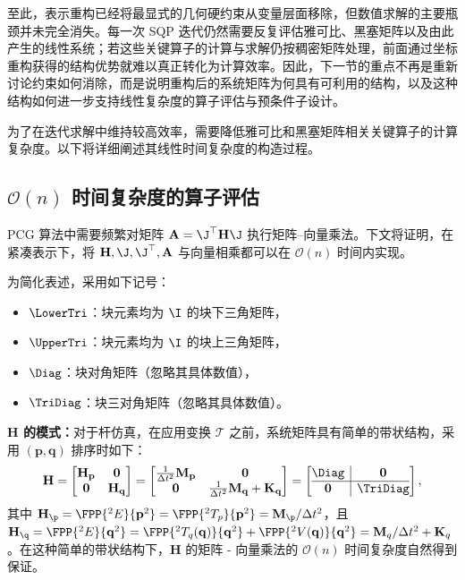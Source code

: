 
至此，表示重构已经将最显式的几何硬约束从变量层面移除，但数值求解的主要瓶颈并未完全消失。每一次 SQP 迭代仍然需要反复评估雅可比、黑塞矩阵以及由此产生的线性系统；若这些关键算子的计算与求解仍按稠密矩阵处理，前面通过坐标重构获得的结构优势就难以真正转化为计算效率。因此，下一节的重点不再是重新讨论约束如何消除，而是说明重构后的系统矩阵为何具有可利用的结构，以及这种结构如何进一步支持线性复杂度的算子评估与预条件子设计。

为了在迭代求解中维持较高效率，需要降低雅可比和黑塞矩阵相关关键算子的计算复杂度。以下将详细阐述其线性时间复杂度的构造过程。
\subsection{\texorpdfstring{$\mathcal{O}(n)$}{O(n)} 时间复杂度的算子评估}
\label{ssec:jacobian-patt}

PCG 算法中需要频繁对矩阵 $\mathbf{A} = \J^\top\mathbf{H}\J$ 执行矩阵--向量乘法。下文将证明，在紧凑表示下，将 $\mathbf{H}, \J, \J^\top, \mathbf{A}$ 与向量相乘都可以在 $\mathcal{O}(n)$ 时间内实现。

为简化表述，采用如下记号：
\begin{itemize}
  \item $\LowerTri$：块元素均为 $\I$ 的块下三角矩阵，
  \item $\UpperTri$：块元素均为 $\I$ 的块上三角矩阵，
  \item $\Diag$：块对角矩阵（忽略其具体数值），
  \item $\TriDiag$：块三对角矩阵（忽略其具体数值）。
\end{itemize}

\textbf{$\mathbf H$ 的模式：}对于杆仿真，在应用变换 $\mathcal T$ 之前，系统矩阵具有简单的带状结构，采用 $(\mathbf{p}, \mathbf{q})$ 排序时如下：
\begin{equation}
  \label{eq:H-patt}
  \mathbf{H} =
  \begin{bmatrix}
    \mathbf{H}_{\mathbf{p}} & \mathbf{0}              \\
    \mathbf{0}              & \mathbf{H}_{\mathbf{q}}
  \end{bmatrix} =
  \begin{bmatrix}
    \frac{1}{\Delta t^{2}}\mathbf{M}_{\mathbf{p}} & \mathbf{0}                                                               \\
    \mathbf{0}                                    & \frac{1}{\Delta t^{2}} \mathbf{M}_{\mathbf{q}} + \mathbf{K}_{\mathbf{q}}
  \end{bmatrix} =
  \left[
    \begin{array}{@{}c|c@{}}
      \Diag      & \mathbf{0} \\
      \hline
      \mathbf{0} & \TriDiag
    \end{array}
    \right],
\end{equation}
其中 $ \mathbf{H}_{\p} = \FPP{^2E}{\mathbf{p}^2} = \FPP{^2T_{p}}{\mathbf{p}^2} =\mathbf{M}_\p/\Delta t^2$，且 $\mathbf{H}_{\q}= \FPP{^2E}{\mathbf{q}^2} = \FPP{^2T_{q}(\mathbf{q})}{\mathbf{q}^2} + \FPP{^2V(\mathbf{q})}{\mathbf{q}^2} = \mathbf{M}_q /\Delta t^2 + \mathbf{K}_q$。在这种简单的带状结构下，$\mathbf H$ 的矩阵 - 向量乘法的 $\mathcal{O}(n)$ 时间复杂度自然得到保证。

